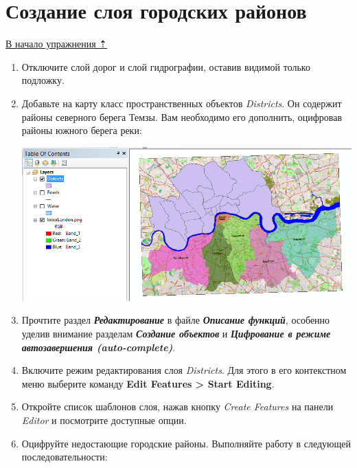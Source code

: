 \documentclass[]{book}
\theoremstyle{definition}
\theoremstyle{definition}
\theoremstyle{definition}
\theoremstyle{remark}
\begin{document}
\hypertarget{map-ref-economic-regions}{%
\section{Создание слоя городских
районов}\label{map-ref-economic-regions}}

\protect\hyperlink{map-ref-economic}{В начало упражнения ⇡}

\begin{enumerate}
\def\labelenumi{\arabic{enumi}.}
\item
  Отключите слой дорог и слой гидрографии, оставив видимой только
  подложку.
\item
  Добавьте на карту класс пространственных объектов \emph{Districts}. Он
  содержит районы северного берега Темзы. Вам необходимо его дополнить,
  оцифровав районы южного берега реки:

  \includegraphics{images/Ex06/image12.png}
\item
  Прочтите раздел \textbf{\emph{Редактирование}} в файле
  \textbf{\emph{Описание функций}}, особенно уделив внимание разделам
  \textbf{\emph{Создание объектов}} и \textbf{\emph{Цифрование в режиме
  автозавершения (auto-complete)}}.
\item
  Включите режим редактирования слоя \emph{Districts}. Для этого в его
  контекстном меню выберите команду \textbf{Edit Features \textgreater{}
  Start Editing}.
\item
  Откройте список шаблонов слоя, нажав кнопку \emph{Create Features} на
  панели \emph{Editor} и посмотрите доступные опции.
\item
  Оцифруйте недостающие городские районы. Выполняйте работу в следующей
  последовательности:


\end{enumerate}
\end{document}
